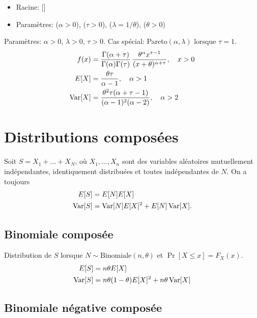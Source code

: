 \begin{itemize}
\item Racine:  []
\item Paramètres:  ($\alpha > 0$),
       ($\tau > 0$),
         ($\lambda = 1/\theta$),
        ($\theta > 0$)
\end{itemize}
Paramètres: $\alpha > 0$, $\lambda > 0$, $\tau > 0$. Cas spécial:
Pareto$(\alpha, \lambda)$ lorsque $\tau = 1$.
\begin{align*}
  f(x) &=
  \frac{\Gamma(\alpha + \tau)}{\Gamma(\alpha) \Gamma(\tau)}\,
  \frac{\theta^\alpha x^{\tau - 1}}{(x + \theta)^{\alpha+\tau}},
  \quad x > 0 \\
  E [ X ]
  &= \frac{\theta \tau}{\alpha - 1}, \quad \alpha > 1 \\
  \operatorname{Var} [ X ]
  &= \frac{\theta^2 \tau (\alpha + \tau - 1)}{(\alpha - 1)^2 (\alpha
    - 2)}, \quad \alpha > 2
\end{align*}


\section{Distributions composées}

Soit $S = X_1 + \dots + X_N$, où $X_1, \dots, X_n$ sont des variables
aléatoires mutuellement indépendantes, identiquement distribuées et
toutes indépendantes de $N$. On a toujours
\begin{align*}
  E [ S ] &= E [ N ] E [ X ] \\
  \operatorname{Var} [ S ] &= \operatorname{Var} [ N ] E [ X ]^2 + E [ N ] \operatorname{Var} [ X ].
\end{align*}

\subsection{Binomiale composée}
\label{distributions:binomialecomposée}

Distribution de $S$ lorsque $N \sim \text{Binomiale}(n, \theta)$ et
$\Pr[X \leq x] = F_X(x)$.
\begin{align*}
  E [ S ] &= n \theta E [ X ] \\
  \operatorname{Var} [ S ] &= n\theta(1 - \theta) E [ X ]^2 + n \theta \operatorname{Var} [ X ]
\end{align*}

\subsection{Binomiale négative composée}
\label{distributions:binomialenegativecomposée}

